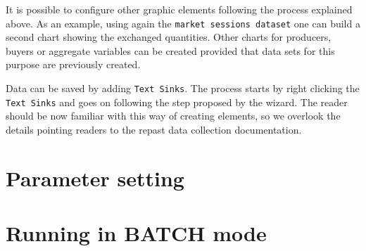 \documentclass{article}
\begin{document}
It is possible to configure other graphic elements following the process explained above. As an example, using again the \verb+market sessions dataset+ one can build a second chart showing the exchanged quantities. 
Other charts for producers, buyers or aggregate variables can be created provided that data sets for this purpose are previously created. 

Data can be saved by adding \verb+Text Sinks+. The process starts by right clicking the \verb+Text Sinks+ and goes on following the step proposed by the wizard. The reader should be now familiar with this way of creating elements, so we overlook the details pointing readers to the repast data collection documentation. 


\section{Parameter setting}\label{sec:parameters}


\section{Running in BATCH mode}

\end{document}
